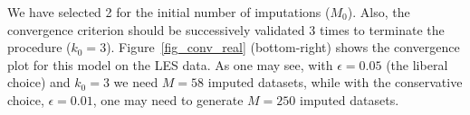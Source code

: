 \documentclass[11pt,a5paper,twoside]{book}
\begin{document}
{{%
%
%
%	
We have selected 2 for the initial number of imputations ($M_0$). Also, the convergence criterion should be successively validated 3 times to terminate the procedure ($k_0=3$). Figure~\ref{fig_conv_real} (bottom-right) shows the convergence plot for this model on the LES data. As one may see, with $\epsilon=0.05$ (the liberal choice) and $k_0=3$ we need $M=58$ imputed datasets, while with the conservative choice, $\epsilon=0.01$, one may need to generate $M=250$ imputed datasets.

}}
\end{document}
